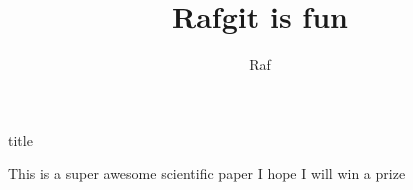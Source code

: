 \documentclass[10pt]{article}
\author{Raf}
\title{Rafgit is fun}
\begin{document}
       \make title

        This is a super awesome scientific paper
        I hope I will win a prize

\end{document}
